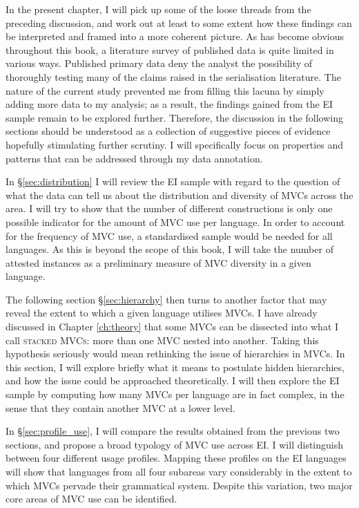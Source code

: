 In the present chapter, I will pick up some of the loose threads from the preceding discussion, and work out at least to some extent how these findings can be interpreted and framed into a more coherent picture. As has become obvious throughout this book, a literature survey of published data is quite limited in various ways. Published primary data deny the analyst the possibility of thoroughly testing many of the claims raised in the serialisation literature. The nature of the current study prevented me from filling this lacuna by simply adding more data to my analysis; as a result, the findings gained from the EI sample remain to be explored further. Therefore, the discussion in the following sections should be understood as a collection of suggestive pieces of evidence hopefully stimulating further scrutiny. I will specifically focus on properties and patterns that can be addressed through my data annotation.

In §\ref{sec:distribution} I will review the EI sample with regard to the question of what the data can tell us about the distribution and diversity of MVCs across the area. I will try to show that the number of different constructions is only one possible indicator for the amount of MVC use per language. In order to account for the frequency of MVC use, a standardised sample would be needed for all languages. As this is beyond the scope of this book, I will take the number of attested instances as a preliminary measure of MVC diversity in a given language.

The following section §\ref{sec:hierarchy} then turns to another factor that may reveal the extent to which a given language utilises MVCs. I have already discussed in Chapter \ref{ch:theory} that some MVCs can be dissected into what I call \textsc{stacked MVCs}: more than one MVC nested into another. Taking this hypothesis seriously would mean rethinking the issue of hierarchies in MVCs. In this section, I will explore briefly what it means to postulate hidden hierarchies, and how the issue could be approached theoretically. I will then explore the EI sample by computing how many MVCs per language are in fact complex, in the sense that they contain another MVC at a lower level.

In §\ref{sec:profile_use}, I will compare the results obtained from the previous two sections, and propose a broad typology of MVC use across EI. I will distinguish between four different usage profiles. Mapping these profiles on the EI languages will show that languages from all four subareas vary considerably in the extent to which MVCs pervade their grammatical system. Despite this variation, two major core areas of MVC use can be identified.

